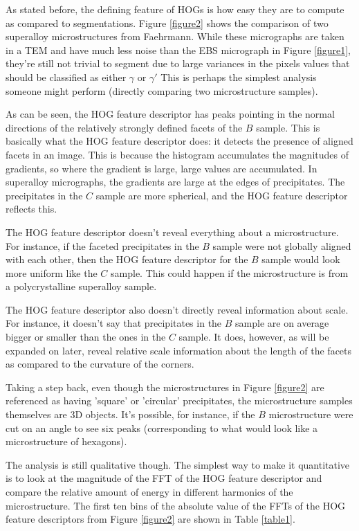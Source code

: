 \documentclass[review]{elsarticle}
\begin{document}
	As stated before, the defining feature of HOGs is how easy they are to compute as compared to segmentations. Figure \ref{figure2} shows the comparison of two superalloy microstructures from Faehrmann\cite{molly}. While these micrographs are taken in a TEM and have much less noise than the EBS micrograph in Figure \ref{figure1}, they're still not trivial to segment due to large variances in the pixels values that should be classified as either $\gamma$ or $\gamma'$ This is perhaps the simplest analysis someone might perform (directly comparing two microstructure samples).

	As can be seen, the HOG feature descriptor has peaks pointing in the normal directions of the relatively strongly defined facets of the $B$ sample. This is basically what the HOG feature descriptor does: it detects the presence of aligned facets in an image. This is because the histogram accumulates the magnitudes of gradients, so where the gradient is large, large values are accumulated. In superalloy micrographs, the gradients are large at the edges of precipitates. The precipitates in the $C$ sample are more spherical, and the HOG feature descriptor reflects this.
	
	The HOG feature descriptor doesn't reveal everything about a microstructure. For instance, if the faceted precipitates in the $B$ sample were not globally aligned with each other, then the HOG feature descriptor for the $B$ sample would look more uniform like the $C$ sample. This could happen if the microstructure is from a polycrystalline superalloy sample.
	
	The HOG feature descriptor also doesn't directly reveal information about scale. For instance, it doesn't say that precipitates in the $B$ sample are on average bigger or smaller than the ones in the $C$ sample. It does, however, as will be expanded on later, reveal relative scale information about the length of the facets as compared to the curvature of the corners.
	
	Taking a step back, even though the microstructures in Figure \ref{figure2} are referenced as having 'square' or 'circular' precipitates, the microstructure samples themselves are 3D objects. It's possible, for instance, if the $B$ microstructure were cut on an angle to see six peaks (corresponding to what would look like a microstructure of hexagons).
	
	The analysis is still qualitative though. The simplest way to make it quantitative is to look at the magnitude of the FFT of the HOG feature descriptor and compare the relative amount of energy in different harmonics of the microstructure. The first ten bins of the absolute value of the FFTs of the HOG feature descriptors from Figure \ref{figure2} are shown in Table \ref{table1}.
	
\end{document}
